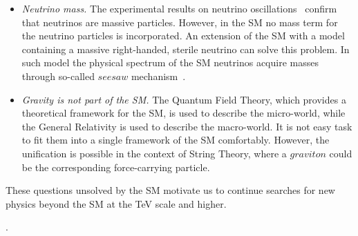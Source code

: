 \begin{itemize}
\item \textit{Neutrino mass.} The experimental results on neutrino oscillations~\cite{Fukuda:1998fd} confirm that neutrinos are massive particles. However, in the SM no mass term for the neutrino particles is incorporated. An extension of the SM with a model containing a massive right-handed, sterile neutrino can solve this problem. In such model the physical spectrum of the SM neutrinos acquire masses through so-called $seesaw$ mechanism~\cite{Mohapatra:1979ia}.
\item \textit{Gravity is not part of the SM.} The Quantum Field Theory, which provides a theoretical framework for the SM, is used to describe the micro-world, while the General Relativity is used to describe the macro-world. It is not easy task to fit them into a single framework of the SM comfortably. However, the unification is possible in the context of String Theory, where a $graviton$ could be the corresponding force-carrying particle.
\end{itemize}

These questions unsolved by the SM motivate us to continue searches for new physics beyond the SM at the TeV scale and higher.




.



